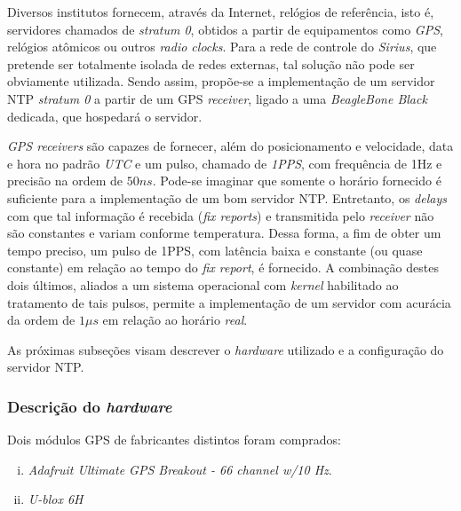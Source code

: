 \vspace{12pt}  

Diversos institutos fornecem, através da Internet, relógios de referência, isto
é, servidores chamados de \textit{stratum 0}, obtidos a partir de equipamentos
como \textit{GPS}, relógios atômicos ou outros \textit{radio clocks}. Para a rede
de controle do \textit{Sirius}, que pretende ser totalmente isolada de redes
externas, tal solução não pode ser obviamente utilizada. Sendo assim, propõe-se
a implementação de um servidor NTP \textit{stratum 0} a partir de um GPS
\textit{receiver}, ligado a uma \textit{BeagleBone Black} dedicada, que
hospedará o servidor.

\vspace{12pt}

\textit{GPS receivers} são capazes de fornecer, além do posicionamento e
velocidade, data e hora no padrão \textit{UTC} e um pulso, chamado de
\textit{1PPS}, com frequência de 1Hz e precisão na ordem de \(50ns\). Pode-se
imaginar que somente o horário fornecido é suficiente para a implementação de um
bom servidor NTP. Entretanto, os \textit{delays} com que tal informação é
recebida (\textit{fix reports}) e transmitida pelo \textit{receiver} não são
constantes e variam conforme temperatura. Dessa forma, a fim de obter um tempo
preciso, um pulso de 1PPS, com latência baixa e constante (ou quase constante)
em relação ao tempo do \textit{fix report}, é fornecido. A combinação destes
dois últimos, aliados a um sistema operacional com \textit{kernel} habilitado ao
tratamento de tais pulsos, permite a implementação de um servidor com acurácia
da ordem de \(1\mu s\) em relação ao horário \textit{real}.

\vspace{12pt}

As próximas subseções visam descrever o \textit{hardware} utilizado e a
configuração do servidor NTP.

\subsubsection{Descrição do \textit{hardware}}

Dois módulos GPS de fabricantes distintos foram comprados:

\begin{enumerate}[i.]
  \item \textit{Adafruit Ultimate GPS Breakout - 66 channel w/10 Hz}.
  \item \textit{U-blox 6H}
\end{enumerate}

